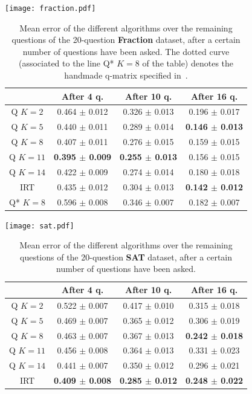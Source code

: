\documentclass{edm_template}
\begin{document}
\begin{table}[h]
\texttt{[image: fraction.pdf]}
\small\centering\begin{tabular}{@{}c|ccc@{}}
& After 4 q. & After 10 q. & After 16 q.\\
\hline
Q $K = 2$ & 0.464 $\pm$ 0.012 & 0.326 $\pm$ 0.013 & 0.196 $\pm$ 0.017 \\
Q $K = 5$ & 0.440 $\pm$ 0.011 & 0.289 $\pm$ 0.014 & \textbf{0.146 $\pm$ 0.013} \\
Q $K = 8$ & 0.407 $\pm$ 0.011 & 0.276 $\pm$ 0.015 & 0.159 $\pm$ 0.015 \\
Q $K = 11$ & \textbf{0.395 $\pm$ 0.009} & \textbf{0.255 $\pm$ 0.013} & 0.156 $\pm$ 0.015 \\
Q $K = 14$ & 0.422 $\pm$ 0.009 & 0.274 $\pm$ 0.014 & 0.180 $\pm$ 0.018 \\
IRT & 0.435 $\pm$ 0.012 & 0.304 $\pm$ 0.013 & \textbf{0.142 $\pm$ 0.012} \\
Q* $K = 8$ & 0.596 $\pm$ 0.008 & 0.346 $\pm$ 0.007 & 0.182 $\pm$ 0.007 \\
\end{tabular}
\caption{Mean error of the different algorithms over the remaining questions of the 20-question \textbf{Fraction} dataset, after a certain number of questions have been asked. The dotted curve (associated to the line Q* $K = 8$ of the table) denotes the handmade q-matrix specified in~\cite{DeLaTorreDouglas2004,DeCarlo2010}.}
\label{tab:fraction}
\end{table}

\begin{table}[h]
\texttt{[image: sat.pdf]}
\small\centering\begin{tabular}{@{}c|ccc@{}}
& After 4 q. & After 10 q. & After 16 q.\\
\hline
Q $K = 2$ & 0.522 $\pm$ 0.007 & 0.417 $\pm$ 0.010 & 0.315 $\pm$ 0.018 \\
Q $K = 5$ & 0.469 $\pm$ 0.007 & 0.365 $\pm$ 0.012 & 0.306 $\pm$ 0.019 \\
Q $K = 8$ & 0.463 $\pm$ 0.007 & 0.367 $\pm$ 0.013 & \textbf{0.242 $\pm$ 0.018} \\
Q $K = 11$ & 0.456 $\pm$ 0.008 & 0.364 $\pm$ 0.013 & 0.331 $\pm$ 0.023 \\
Q $K = 14$ & 0.441 $\pm$ 0.007 & 0.350 $\pm$ 0.012 & 0.296 $\pm$ 0.021 \\
IRT & \textbf{0.409 $\pm$ 0.008} & \textbf{0.285 $\pm$ 0.012} & \textbf{0.248 $\pm$ 0.022} \\
\end{tabular}
\caption{Mean error of the different algorithms over the remaining questions of the 20-question \textbf{SAT} dataset, after a certain number of questions have been asked.}
\label{tab:sat}
\end{table}
\end{document}
